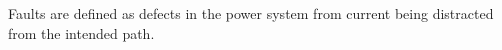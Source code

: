Faults are defined as defects in the power system from current being distracted from the intended path. 